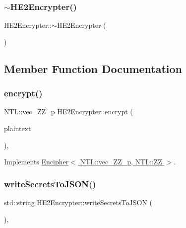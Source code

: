\subsubsection{\texorpdfstring{$\sim$\+H\+E2\+Encrypter()}{~HE2Encrypter()}}
{\footnotesize\ttfamily H\+E2\+Encrypter\+::$\sim$\+H\+E2\+Encrypter (\begin{DoxyParamCaption}{ }\end{DoxyParamCaption})\hspace{0.3cm}{\ttfamily [virtual]}}



\subsection{Member Function Documentation}
\mbox{\label{classHE2Encrypter_a57e4bdacbab9b11467f26deab921d134}} 
\subsubsection{\texorpdfstring{encrypt()}{encrypt()}}
{\footnotesize\ttfamily N\+T\+L\+::vec\+\_\+\+Z\+Z\+\_\+p H\+E2\+Encrypter\+::encrypt (\begin{DoxyParamCaption}\item[{N\+T\+L\+::\+ZZ \&}]{plaintext }\end{DoxyParamCaption})\hspace{0.3cm}{\ttfamily [override]}, {\ttfamily [virtual]}}



Implements \hyperlink{classEncipher_aaf8138eb280608bfd03c6eb762ffc010}{Encipher$<$ N\+T\+L\+::vec\+\_\+\+Z\+Z\+\_\+p, N\+T\+L\+::\+Z\+Z $>$}.

\mbox{\label{classHE2Encrypter_a8cdf863bfbe046b4e57322adf5addddb}} 
\subsubsection{\texorpdfstring{write\+Secrets\+To\+J\+S\+O\+N()}{writeSecretsToJSON()}}
{\footnotesize\ttfamily std\+::string H\+E2\+Encrypter\+::write\+Secrets\+To\+J\+S\+ON (\begin{DoxyParamCaption}{ }\end{DoxyParamCaption})\hspace{0.3cm}{\ttfamily [override]}, {\ttfamily [virtual]}}



